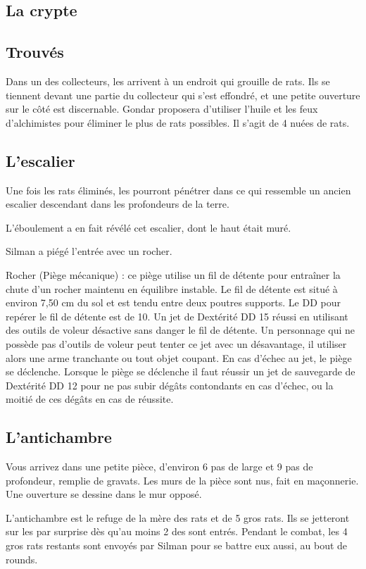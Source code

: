 \documentclass[a4paper,10pt,openany]{book}
\begin{document}
\begin{multicols}{2}
\section{La crypte}
\subsection{Trouvés}
Dans un des collecteurs, les \PJs arrivent à un endroit qui grouille de rats. Ils se tiennent devant une partie du collecteur qui s’est effondré, et
une petite ouverture sur le côté est discernable. Gondar proposera d’utiliser l’huile et les feux d’alchimistes pour éliminer le plus de rats
possibles. Il s’agit de 4 nuées de rats.
\subsection{L’escalier}
Une fois les rats éliminés, les \PJs pourront pénétrer dans ce qui ressemble un ancien escalier descendant dans les profondeurs de la terre.\par
L’éboulement a en fait révélé cet escalier, dont le haut était muré.\par Silman a piégé l’entrée avec un rocher.

\begin{quotebox}
	Rocher (Piège mécanique) : ce piège utilise un fil de détente pour entraîner la chute d’un rocher maintenu en équilibre instable. Le fil de détente
	est situé à environ 7,50 cm du sol et est tendu entre deux poutres supports. Le DD pour repérer le fil de détente est de 10. Un jet de Dextérité DD
	15 réussi en utilisant des outils de voleur désactive sans danger le fil de détente. Un personnage qui ne possède pas d’outils de voleur peut tenter
	ce jet avec un désavantage, il utiliser alors une arme tranchante ou tout objet coupant. En cas d’échec au jet, le piège se déclenche. Lorsque le
	piège se déclenche il faut réussir un jet de sauvegarde de Dextérité DD 12 pour ne pas subir  dégâts contondants en cas d’échec, ou la
	moitié de ces dégâts en cas de réussite. 
\end{quotebox}

\subsection{L’antichambre}

\begin{paperbox}{ }
	Vous arrivez dans une petite pièce, d’environ 6 pas de large et 9 pas de profondeur, remplie de gravats. Les murs de la pièce sont nus, fait en
	maçonnerie. Une ouverture se dessine dans le mur opposé. 
\end{paperbox}
L’antichambre est le refuge de la mère des rats et de 5 gros rats. Ils se jetteront sur les \PJs par surprise dès qu’au moins 2 des \PJs sont
entrés. Pendant le combat, les 4 gros rats restants sont envoyés par Silman pour se battre eux aussi, au bout de  rounds.


\end{multicols}
\end{document}
